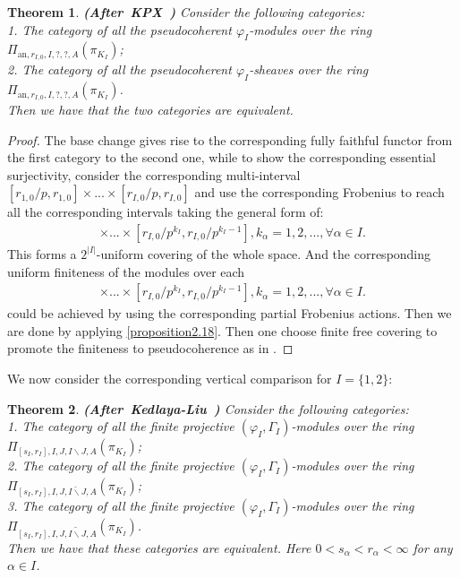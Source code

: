 \documentclass[12pt]{amsart}
\newtheorem{theorem}{Theorem}[section]
\theoremstyle{definition}
\numberwithin{equation}{section}
\begin{document}
\begin{theorem}\mbox{\bf{(After KPX \cite[Proposition 2.2.7]{KPX})}} 
Consider the following categories:\\
1. The category of all the pseudocoherent $\varphi_I$-modules over the ring $\Pi_{\mathrm{an},r_{I,0},I,?,?,A}(\pi_{K_I})$;\\
2. The category of all the pseudocoherent $\varphi_I$-sheaves over the ring $\Pi_{\mathrm{an},r_{I,0},I,?,?,A}(\pi_{K_I})$.\\
Then we have that the two categories are equivalent.	
\end{theorem}


\begin{proof}
The base change gives rise to the corresponding fully faithful functor from the first category to the second one, while to show the corresponding essential surjectivity, consider the corresponding multi-interval $[r_{1,0}/p,r_{1,0}]\times...\times [r_{I,0}/p,r_{I,0}]$ and use the corresponding Frobenius to reach all the corresponding intervals taking the general form of:
\begin{align}
[r_{1,0}/p^{k_1},r_{1,0}/p^{k_1-1}]\times...\times [r_{I,0}/p^{k_I},r_{I,0}/p^{k_I-1}],k_\alpha=1,2,...,\forall\alpha\in I.	
\end{align}
This forms a $2^{|I|}$-uniform covering of the whole space. And the corresponding uniform finiteness of the modules over each 
\begin{align}
[r_{1,0}/p^{k_1},r_{1,0}/p^{k_1-1}]\times...\times [r_{I,0}/p^{k_I},r_{I,0}/p^{k_I-1}],k_\alpha=1,2,...,\forall\alpha\in I.	
\end{align}	
could be achieved by using the corresponding partial Frobenius actions. Then we are done by applying \cref{proposition2.18}. Then one choose finite free covering to promote the finiteness to pseudocoherence as in \cite[Theorem 4.6.1, Lemma 5.4.11]{KL2}.
\end{proof}




\indent We now consider the corresponding vertical comparison for $I=\{1,2\}$:


\begin{theorem}\mbox{\bf{(After Kedlaya-Liu \cite[Theorem 5.7.5]{KL2})}} 
Consider the following categories:\\
1. The category of all the finite projective $(\varphi_I,\Gamma_I)$-modules over the ring $\Pi_{[s_I,r_{I}],I,J,I\backslash J,A}(\pi_{K_I})$;\\
2. The category of all the finite projective $(\varphi_I,\Gamma_I)$-modules over the ring $\Pi_{[s_I,r_{I}],I,J,\breve{I\backslash J},A}(\pi_{K_I})$;\\
3. The category of all the finite projective $(\varphi_I,\Gamma_I)$-modules over the ring $\Pi_{[s_I,r_{I}],I,J,\widetilde{I\backslash J},A}(\pi_{K_I})$.\\
Then we have that these categories are equivalent. Here $0< s_\alpha<r_\alpha<\infty$ for any $\alpha\in I$.
\end{theorem}
\end{document}
